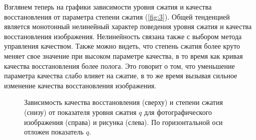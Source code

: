 \documentclass[12pt,a4paper]{article}
\begin{document}
            Взглянем теперь на графики зависимости уровня сжатия и качества восстановления от параметра степени сжатия (\autoref{fig:3}). Общей тенденцией является монотонный нелинейный характер поведения уровня сжатия и качества восстановления изображения. Нелинейность связана также с выбором метода управления качеством. Также можно видеть, что степень сжатия более круто меняет свое значение при высоком параметре качества, в то время как кривая качества восстановления более полога. Это говорит о том, что уменьшение параметра качества слабо влияет на сжатие, в то же время вызывая сильное изменение качества восстановления изображения.
            \begin{figure}[!htb]%
                \centering
                \hspace{8pt}%
                \hspace{8pt}%
                \hspace{8pt}%
                \hspace{8pt}%
                \caption[]{Зависимость качества восстановления (сверху) и степени сжатия (снизу) от показателя уровня сжатия $q$ для фотографического изображения (справа) и рисунка (слева). По горизонтальной оси отложен показатель $q$.}%
                \label{fig:3}%
            \end{figure}
\end{document}
